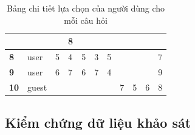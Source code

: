 \begin{table}[H]
{\begin{tabular}{|C{1cm}|p{1cm}|C{1cm}|C{1cm}|C{1cm}|C{1cm}|C{1.2cm}|C{1.2cm}|C{1.2cm}|C{1.2cm}|C{1.2cm}|}
                &
                &
                &
                8 
            \\ \hline
                \textbf{8} &
                user &
                5 &
                4 &
                5 &
                3 &
                5 &
                &
                &
                &
                7 
            \\ \hline
                \textbf{9} &
                user &
                6 &
                7 &
                6 &
                7 &
                4 &
                &
                &
                &
                9 
            \\ \hline
                \textbf{10} &
                guest &
                &
                &
                &
                &
                &
                7 &
                5 &
                6 &
                8 
            \\ \hline
        \end{tabular}
    }
    \caption{Bảng chi tiết lựa chọn của người dùng cho mỗi câu hỏi}
\end{table}

\subsection{Kiểm chứng dữ liệu khảo sát}

